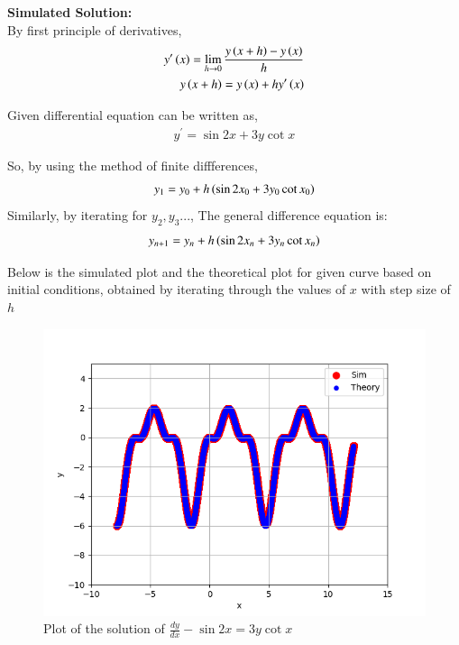 \documentclass[journal]{IEEEtran}
\begin{document}
\textbf{Simulated Solution:}\\

By first principle of derivatives,
\begin{align}
	y^{\prime}\left(x\right) = \lim_{h\to 0}\frac{y\left(x+h\right) - y\left(x\right)}{h}\\
	y\left(x+h\right) = y\left(x\right) + hy^{\prime}\left(x\right)
\end{align}

Given differential equation can be written as,
\begin{align}
	y^{\prime} = \sin2x + 3y \cot x  
\end{align}

So, by using the method of finite diffferences,
\begin{align}
	y_1 = y_0 + h \left(\sin2x_0 + 3y_0 \cot x_0\right)
\end{align}
Similarly, by iterating for $y_2, y_3$...,
The general difference equation is:
\begin{align}
	y_{n+1} = y_n + h \left(\sin2x_n + 3y_n \cot x_n\right)
\end{align}

Below is the simulated plot and the theoretical plot for given curve  based on initial conditions, obtained by iterating through the values of $x$ with step size of $h$
\begin{figure}[h!]
	\centering
	\includegraphics[width=1\columnwidth]{figs/simulated.png}
	\caption{Plot of the solution of $\frac{dy}{dx} - \sin 2x = 3y \cot x$}
	\label{stemplot}
\end{figure}
\end{document}
